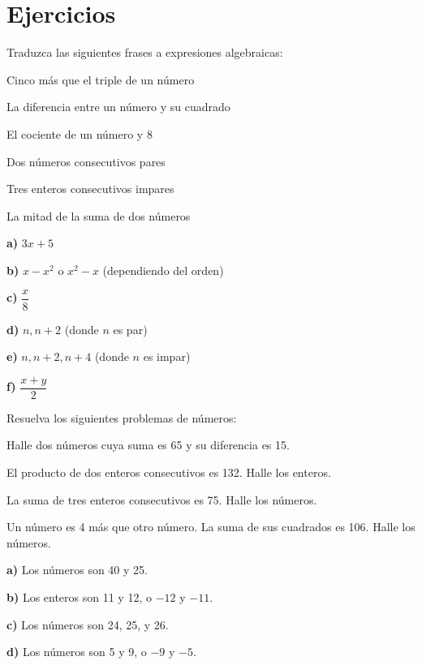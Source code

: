 
\section{Ejercicios}

\begin{exercise}
\problem Traduzca las siguientes frases a expresiones algebraicas:

\begin{exerciselist}
    \item Cinco más que el triple de un número
    \item La diferencia entre un número y su cuadrado
    \item El cociente de un número y 8
    \item Dos números consecutivos pares
    \item Tres enteros consecutivos impares
    \item La mitad de la suma de dos números
\end{exerciselist}

\begin{solucion}
\textbf{a)} $3x + 5$

\textbf{b)} $x - x^2$ o $x^2 - x$ (dependiendo del orden)

\textbf{c)} $\dfrac{x}{8}$

\textbf{d)} $n, n+2$ (donde $n$ es par)

\textbf{e)} $n, n+2, n+4$ (donde $n$ es impar)

\textbf{f)} $\dfrac{x + y}{2}$
\end{solucion}
\end{exercise}

\begin{exercise}
\problem Resuelva los siguientes problemas de números:

\begin{exerciselist}
    \item Halle dos números cuya suma es 65 y su diferencia es 15.
    \item El producto de dos enteros consecutivos es 132. Halle los enteros.
    \item La suma de tres enteros consecutivos es 75. Halle los números.
    \item Un número es 4 más que otro número. La suma de sus cuadrados es 106. Halle los números.
\end{exerciselist}

\begin{solucion}
\textbf{a)} Los números son 40 y 25.

\textbf{b)} Los enteros son 11 y 12, o $-12$ y $-11$.

\textbf{c)} Los números son 24, 25, y 26.

\textbf{d)} Los números son 5 y 9, o $-9$ y $-5$.
\end{solucion}
\end{exercise}

